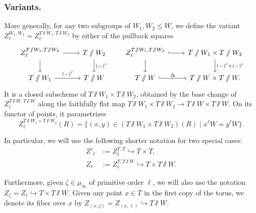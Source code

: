 \subsubsection{Variants.}
More generally, for any two subgroups of $ W_1, W_2 \leq W$, we define the variant $Z^{W_1, W_2}_{\ell} = Z_{\ell}^{T \sslash W_1, T\sslash W_2}$ by either of the pullback squares
\begin{equation*}
\begin{tikzcd}
Z_{\ell}^{T \sslash W_1, T\sslash W_2} \arrow[d] \arrow[r]  & T \sslash W_2 \arrow[d, "(-)^{\ell}"]  \\
T \sslash W_1 \arrow[r, "(-)^{\ell}"] & T \sslash W
\end{tikzcd}
\qquad
\begin{tikzcd}
Z^{T \sslash W_1, T\sslash W_2}_{\ell} \arrow[r, hook] \arrow[d] & T\sslash W_1 \times T\sslash W_2 \arrow[d, "(-)^{\ell} \times (-)^{\ell}"] \\
T\sslash W \arrow[r, hook, "\Delta"] & T\sslash W \times T\sslash W.
\end{tikzcd}
\end{equation*}
It is a closed subscheme of $T\sslash W_1 \times T\sslash W_2$, obtained by the base change of $Z^{T \sslash W, T \sslash W}_{\ell}$ along the faithfully flat map $T\sslash W_1 \times T\sslash W_2 \to T\sslash W \times T\sslash W$.
%
On its functor of points, it parametrizes
\begin{equation*}
Z^{T\sslash W_1 \times T\sslash W_2}_{\ell}(R) = \{ (x, y) \in (T\sslash W_1 \times T\sslash W_2)(R) \mid x^{\ell} W = y^{\ell} W \}.    
\end{equation*}

\begin{notation}\label{notation: quasi-diagonals}
In particular, we will use the following shorter notation for two special cases:
\begin{align*}
Z'_{\ell} & := Z^{T, T}_{\ell} \hookrightarrow T \times T,   \\
Z_{\ell} & := Z^{T, T\sslash W}_{\ell} \hookrightarrow T \times T \sslash W.
\end{align*}
\end{notation}

\begin{notation}
Furthermore, given $\zeta \in \mu_{\infty}$ of primitive order $\ell$, we will also use the notation $Z_{\zeta} = Z_{\ell}\hookrightarrow T \times T \sslash W$. Given any point $x \in T$ in the first copy of the torus, we denote its fiber over $x$ by $Z_{(x, \zeta)} = Z_{(x, \ell)} \hookrightarrow T \sslash W$.    
\end{notation}




